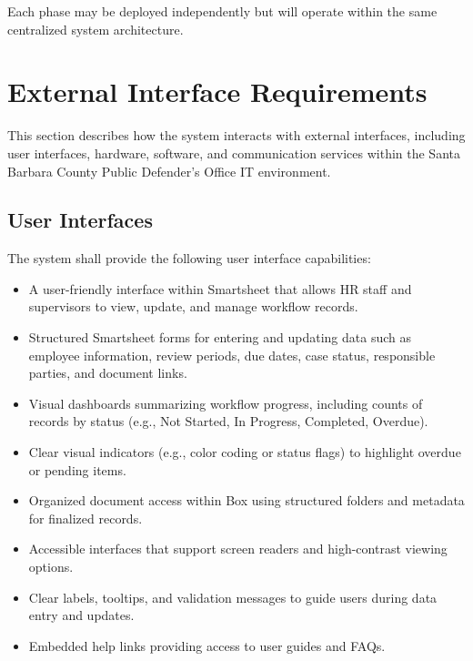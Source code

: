 \documentclass[12pt]{article}
\begin{document}
Each phase may be deployed independently but will operate within the same centralized system architecture.

\section{External Interface Requirements}

This section describes how the system interacts with external interfaces, including user interfaces, hardware, software, and communication services within the Santa Barbara County Public Defender’s Office IT environment.


\subsection{User Interfaces}

The system shall provide the following user interface capabilities:

\begin{itemize}
    \item A user-friendly interface within Smartsheet that allows HR staff and supervisors to view, update, and manage workflow records.
    
    \item Structured Smartsheet forms for entering and updating data such as employee information, review periods, due dates, case status, responsible parties, and document links.
    
    \item Visual dashboards summarizing workflow progress, including counts of records by status (e.g., Not Started, In Progress, Completed, Overdue).
    
    \item Clear visual indicators (e.g., color coding or status flags) to highlight overdue or pending items.
    
    \item Organized document access within Box using structured folders and metadata for finalized records.
    
    \item Accessible interfaces that support screen readers and high-contrast viewing options.
    
    \item Clear labels, tooltips, and validation messages to guide users during data entry and updates.
    
    \item Embedded help links providing access to user guides and FAQs.
\end{itemize}
\end{document}
